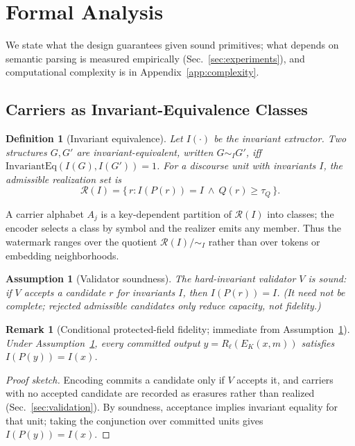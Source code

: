 \documentclass[11pt]{article}
\newtheorem{definition}{Definition}
\newtheorem{assumption}{Assumption}
\newtheorem{remark}{Remark}
\begin{document}
\section{Formal Analysis}
\label{sec:analysis}
We state what the design guarantees given sound primitives; what depends on semantic parsing is measured empirically (Sec.~\ref{sec:experiments}), and computational complexity is in Appendix~\ref{app:complexity}.

\subsection{Carriers as Invariant-Equivalence Classes}
\begin{definition}[Invariant equivalence]
Let $I(\cdot)$ be the invariant extractor. Two structures $G,G'$ are invariant-equivalent, written $G\sim_I G'$, iff $\mathrm{InvariantEq}(I(G),I(G'))=1$. For a discourse unit with invariants $I$, the admissible realization set is
\begin{equation}
\mathcal{R}(I)=\{\,r : I(P(r))=I \ \land\ Q(r)\ge \tau_Q\,\}.
\end{equation}
\end{definition}
A carrier alphabet $A_j$ is a key-dependent partition of $\mathcal{R}(I)$ into classes; the encoder selects a class by symbol and the realizer emits any member. Thus the watermark ranges over the quotient $\mathcal{R}(I)/{\sim_I}$ rather than over tokens or embedding neighborhoods.

\begin{assumption}[Validator soundness]
\label{as:validator}
The hard-invariant validator $V$ is sound: if $V$ accepts a candidate $r$ for invariants $I$, then $I(P(r))=I$. (It need not be complete; rejected admissible candidates only reduce capacity, not fidelity.)
\end{assumption}

\begin{remark}[Conditional protected-field fidelity; immediate from Assumption~\ref{as:validator}]
\label{prop:fidelity}
Under Assumption~\ref{as:validator}, every committed output $y=R_\ell(E_K(x,m))$ satisfies $I(P(y))=I(x)$.
\end{remark}
\begin{proof}[Proof sketch]
Encoding commits a candidate only if $V$ accepts it, and carriers with no accepted candidate are recorded as erasures rather than realized (Sec.~\ref{sec:validation}). By soundness, acceptance implies invariant equality for that unit; taking the conjunction over committed units gives $I(P(y))=I(x)$.
\end{proof}
\end{document}
